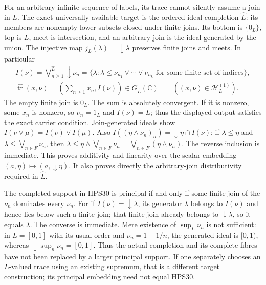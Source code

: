 For an arbitrary infinite sequence of labels,
its trace cannot silently assume a join in $L$.
The exact universally available target is the
ordered ideal completion $\widehat L$:
its members are nonempty lower subsets
closed under finite joins. Its bottom is
$\{0_L\}$, top is $L$, meet is intersection,
and an arbitrary join is the ideal generated
by the union. The injective map
$j_L(\lambda)=\downarrow\lambda$ preserves
finite joins and meets. In particular
\begin{equation}\tag{HPS30}
\begin{gathered}
 I(\nu)=\bigvee_{n\ge1}^{\widehat L}\downarrow\nu_n
   =\{\lambda:\lambda\le\nu_{n_1}\vee\cdots\vee\nu_{n_k}
                     \text{ for some finite set of indices}\},\\
 \widehat{\operatorname{tr}}(x,\nu)
       =\left(\sum_{n\ge1}x_n,I(\nu)\right)
       \in G_{\widehat L}(\mathbb C)
                            \qquad((x,\nu)\in\mathcal H_L^{(1)}).
\end{gathered}
\end{equation}
The empty finite join is $0_L$.
The sum is absolutely convergent. If it
is nonzero, some $x_n$ is nonzero, so
$\nu_n=1_L$ and $I(\nu)=L$; thus the
displayed output satisfies the exact
carrier condition. Join-generated ideals
show $I(\nu\vee\mu)=I(\nu)\vee I(\mu)$.
Also
$I((\eta\wedge\nu_n)_n)=
\downarrow\eta\cap I(\nu)$:
if $\lambda\le\eta$ and
$\lambda\le\bigvee_{n\in F}\nu_n$, then
$\lambda\le\eta\wedge\bigvee_{n\in F}\nu_n
=\bigvee_{n\in F}(\eta\wedge\nu_n)$.
The reverse inclusion is immediate.
This proves additivity and linearity over
the scalar embedding
$(a,\eta)\mapsto(a,\downarrow\eta)$.
It also proves directly the arbitrary-join
distributivity required in $\widehat L$.

The completed support in HPS30 is principal
if and only if some finite join of the
$\nu_n$ dominates every $\nu_n$.
For if $I(\nu)=\downarrow\lambda$, its
generator $\lambda$ belongs to $I(\nu)$
and hence lies below such a finite join;
that finite join already belongs to
$\downarrow\lambda$, so it equals
$\lambda$. The converse is immediate.
Mere existence of $\sup_L\nu_n$ is not
sufficient: in $L=[0,1]$ with its usual
order and $\nu_n=1-1/n$, the generated
ideal is $[0,1)$, whereas
$\downarrow\sup_n\nu_n=[0,1]$.
Thus the actual completion and its
complete fibres have not been replaced
by a larger principal support.
If one separately chooses an $L$-valued
trace using an existing supremum, that is
a different target construction; its
principal embedding need not equal HPS30.

